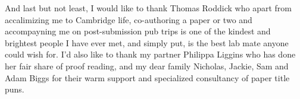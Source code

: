 \begin{acknowledgements}
And last but not least, I would like to thank Thomas Roddick who apart from accalimizing me to Cambridge life, co-authoring a paper or two and accompayning me on post-submission pub trips is one of the kindest and brightest people I have ever met, and simply put, is the best lab mate anyone could wish for. I'd also like to thank my partner Philippa Liggins who has done her fair share of proof reading, and my dear family Nicholas, Jackie, Sam and Adam Biggs for their warm support and specialized consultancy of paper title puns.









\end{acknowledgements}
